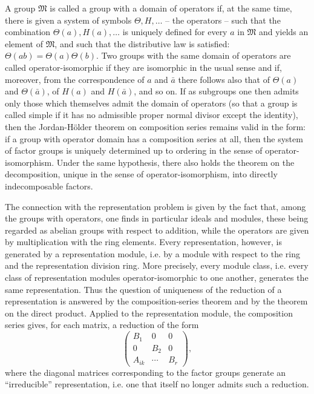 \documentclass[11pt]{article}
\begin{document}
A group $\mathfrak{M}$ is called a group with a domain of operators if, at the same time, there is given a system of symbols $\Theta,H,\ldots$ -- the operators -- such that the combination $\Theta(a),H(a),\ldots$ is uniquely defined for every $a$ in $\mathfrak{M}$ and yields an element of $\mathfrak{M}$, and such that the distributive law is satisfied: $\Theta(ab)=\Theta(a)\Theta(b)$. Two groups with the same domain of operators are called operator-isomorphic if they are isomorphic in the usual sense and if, moreover, from the correspondence of $a$ and $\bar a$ there follows also that of $\Theta(a)$ and $\Theta(\bar a)$, of $H(a)$ and $H(\bar a)$, and so on. If as subgroups one then admits only those which themselves admit the domain of operators (so that a group is called simple if it has no admissible proper normal divisor except the identity), then the Jordan-Hölder theorem on composition series remains valid in the form: if a group with operator domain has a composition series at all, then the system of factor groups is uniquely determined up to ordering in the sense of operator-isomorphism. Under the same hypothesis, there also holds the theorem on the decomposition, unique in the sense of operator-isomorphism, into directly indecomposable factors.

The connection with the representation problem is given by the fact that, among the groups with operators, one finds in particular ideals and modules, these being regarded as abelian groups with respect to addition, while the operators are given by multiplication with the ring elements. Every representation, however, is generated by a representation module, i.e. by a module with respect to the ring and the representation division ring. More precisely, every module class, i.e. every class of representation modules operator-isomorphic to one another, generates the same representation. Thus the question of uniqueness of the reduction of a representation is answered by the composition-series theorem and by the theorem on the direct product. Applied to the representation module, the composition series gives, for each matrix, a reduction of the form
\[
\begin{pmatrix}
B_1&0&0\\
0&B_2&0\\
A_{ik}&\cdots&B_r
\end{pmatrix},
\]
where the diagonal matrices corresponding to the factor groups generate an ``irreducible'' representation, i.e. one that itself no longer admits such a reduction.
\end{document}
